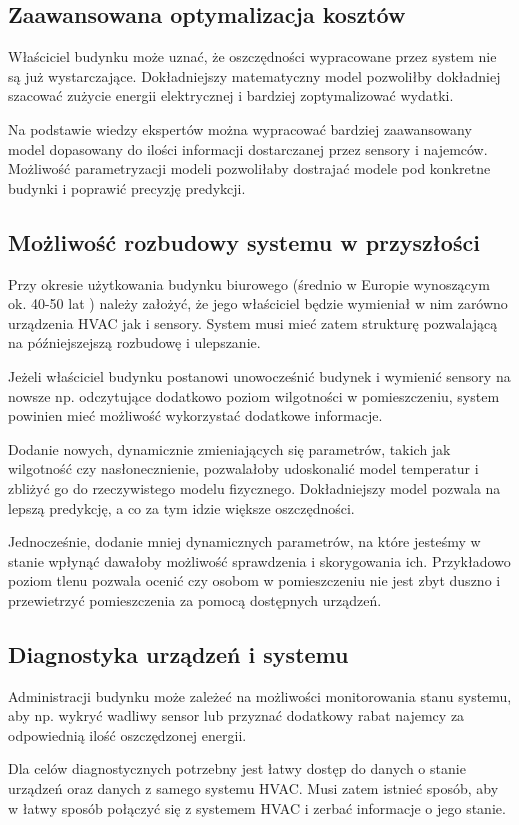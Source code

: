 \subsection*{Zaawansowana optymalizacja kosztów}
Właściciel budynku może uznać, że oszczędności wypracowane przez system nie są już wystarczające. 
Dokładniejszy matematyczny model pozwoliłby dokładniej szacować zużycie energii elektrycznej i bardziej zoptymalizować wydatki. 

Na podstawie wiedzy ekspertów można wypracować bardziej zaawansowany model dopasowany do ilości informacji dostarczanej przez sensory i najemców.
Możliwość parametryzacji modeli pozwoliłaby dostrajać modele pod konkretne budynki i poprawić precyzję predykcji.

\subsection*{Możliwość rozbudowy systemu w przyszłości}
Przy okresie użytkowania budynku biurowego (średnio w Europie wynoszącym ok. 40-50 lat \cite{bib:wiekBudynku}) należy założyć, że jego właściciel będzie wymieniał w nim zarówno urządzenia HVAC jak i sensory. System musi mieć zatem strukturę pozwalającą na późniejszejszą rozbudowę i ulepszanie. 

Jeżeli właściciel budynku postanowi unowocześnić budynek i wymienić sensory na nowsze np. odczytujące dodatkowo poziom wilgotności w pomieszczeniu, system powinien mieć możliwość wykorzystać dodatkowe informacje.

Dodanie nowych, dynamicznie zmieniających się parametrów, takich jak wilgotność czy nasłonecznienie, pozwalałoby udoskonalić model temperatur i zbliżyć go do rzeczywistego modelu fizycznego. Dokładniejszy model pozwala na lepszą predykcję, a co za tym idzie większe oszczędności.

Jednocześnie, dodanie mniej dynamicznych parametrów, na które jesteśmy w stanie wpłynąć dawałoby możliwość sprawdzenia i skorygowania ich. Przykładowo poziom tlenu pozwala ocenić czy osobom w pomieszczeniu nie jest zbyt duszno i przewietrzyć pomieszczenia za pomocą dostępnych urządzeń. 

\subsection*{Diagnostyka urządzeń i systemu}
Administracji budynku może zależeć na możliwości monitorowania stanu systemu, aby np. wykryć wadliwy sensor lub przyznać dodatkowy rabat najemcy za odpowiednią ilość oszczędzonej energii.

Dla celów diagnostycznych potrzebny jest łatwy dostęp do danych o stanie urządzeń oraz danych z samego systemu HVAC. Musi zatem istnieć sposób, aby w łatwy sposób połączyć się z systemem HVAC i zerbać informacje o jego stanie.